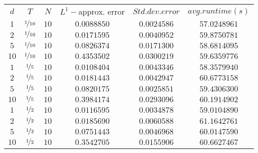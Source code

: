 \begin{tabular}{cccccc}
$d$ & $T$ & $N$ & $L^1-$approx. error & $Std. dev. error$ & $avg. runtime (s)$\\
$1$ & $\nicefrac{1}{10}$ & $10$ & $0.0088850$ & $0.0024586$ & $57.0248961$\\
$2$ & $\nicefrac{1}{10}$ & $10$ & $0.0171595$ & $0.0040952$ & $59.8750781$\\
$5$ & $\nicefrac{1}{10}$ & $10$ & $0.0826374$ & $0.0171300$ & $58.6814095$\\
$10$ & $\nicefrac{1}{10}$ & $10$ & $0.4353502$ & $0.0300219$ & $59.6359776$\\
$1$ & $\nicefrac{1}{5}$ & $10$ & $0.0108404$ & $0.0043346$ & $58.3579940$\\
$2$ & $\nicefrac{1}{5}$ & $10$ & $0.0181443$ & $0.0042947$ & $60.6773158$\\
$5$ & $\nicefrac{1}{5}$ & $10$ & $0.0820175$ & $0.0025851$ & $59.4306300$\\
$10$ & $\nicefrac{1}{5}$ & $10$ & $0.3984174$ & $0.0293096$ & $60.1914902$\\
$1$ & $\nicefrac{1}{2}$ & $10$ & $0.0116595$ & $0.0034878$ & $59.0104890$\\
$2$ & $\nicefrac{1}{2}$ & $10$ & $0.0185690$ & $0.0060588$ & $61.1642761$\\
$5$ & $\nicefrac{1}{2}$ & $10$ & $0.0751443$ & $0.0046968$ & $60.0147590$\\
$10$ & $\nicefrac{1}{2}$ & $10$ & $0.3542705$ & $0.0155906$ & $60.6627467$\\
\end{tabular}
